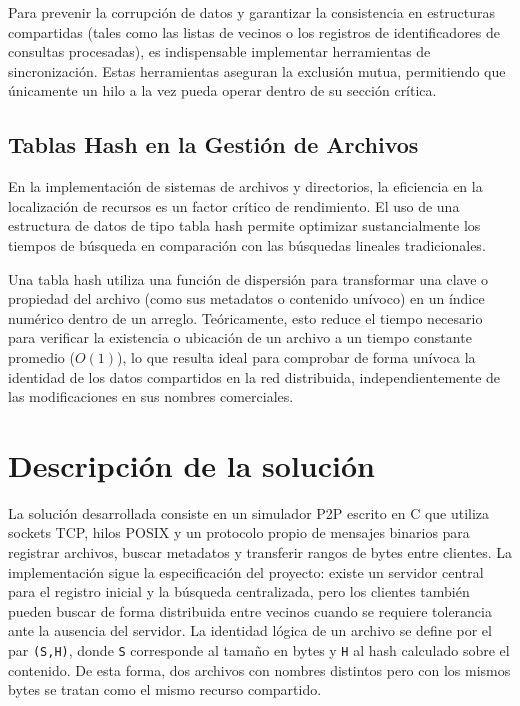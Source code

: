 \documentclass[12pt]{article}
\begin{document}
Para prevenir la corrupción de datos y garantizar la consistencia en estructuras compartidas (tales como las listas de vecinos o los registros de identificadores de consultas procesadas), es indispensable implementar herramientas de sincronización. Estas herramientas aseguran la exclusión mutua, permitiendo que únicamente un hilo a la vez pueda operar dentro de su sección crítica.\cite{silberschatz}
\subsection{Tablas Hash en la Gestión de Archivos}
En la implementación de sistemas de archivos y directorios, la eficiencia en la localización de recursos es un factor crítico de rendimiento. El uso de una estructura de datos de tipo tabla hash permite optimizar sustancialmente los tiempos de búsqueda en comparación con las búsquedas lineales tradicionales.\cite{silberschatz}

Una tabla hash utiliza una función de dispersión para transformar una clave o propiedad del archivo (como sus metadatos o contenido unívoco) en un índice numérico dentro de un arreglo. Teóricamente, esto reduce el tiempo necesario para verificar la existencia o ubicación de un archivo a un tiempo constante promedio ($O(1)$), lo que resulta ideal para comprobar de forma unívoca la identidad de los datos compartidos en la red distribuida, independientemente de las modificaciones en sus nombres comerciales.\cite{silberschatz}


\newpage
\section{Descripción de la solución}

La solución desarrollada consiste en un simulador P2P escrito en C que utiliza
sockets TCP, hilos POSIX y un protocolo propio de mensajes binarios para
registrar archivos, buscar metadatos y transferir rangos de bytes entre
clientes. La implementación sigue la especificación del proyecto: existe un
servidor central para el registro inicial y la búsqueda centralizada, pero los
clientes también pueden buscar de forma distribuida entre vecinos cuando se
requiere tolerancia ante la ausencia del servidor. La identidad lógica de un
archivo se define por el par \texttt{(S,H)}, donde \texttt{S} corresponde al
tamaño en bytes y \texttt{H} al hash calculado sobre el contenido. De esta
forma, dos archivos con nombres distintos pero con los mismos bytes se tratan
como el mismo recurso compartido.
\end{document}
